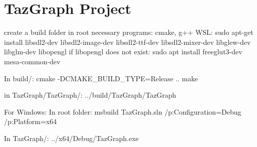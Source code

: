 \chapter{Taz\+Graph Project}
\hypertarget{index}{}\label{index}
\label{index_md__2mnt_2c_2Users_2lefte_2Mujin_2MastersThesis_2Taz_2TazGraph_2README}%
%
 create a build folder in root necessary programs\+: cmake, g++ WSL\+: sudo apt-\/get install libsdl2-\/dev libsdl2-\/image-\/dev libsdl2-\/ttf-\/dev libsdl2-\/mixer-\/dev libglew-\/dev libglm-\/dev libopengl if libopengl does not exist\+: sudo apt install freeglut3-\/dev mesa-\/common-\/dev

In build/\+: cmake -\/DCMAKE\+\_\+\+BUILD\+\_\+\+TYPE=Release .. make

in Taz\+Graph/\+Taz\+Graph/\+: ../build/\+Taz\+Graph/\+Taz\+Graph

For Windows\+: In root folder\+: msbuild Taz\+Graph.\+sln /p\+:Configuration=Debug /p\+:Platform=x64

In Taz\+Graph/\+: ../x64/\+Debug/\+Taz\+Graph.exe 